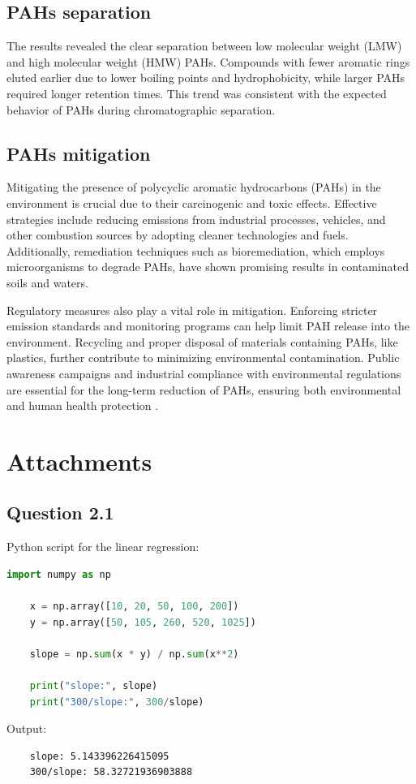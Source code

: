 \documentclass{article}
\newcounter{myequation}
\newcommand{\ccit}[1]{\citeauthor{#1} \cite{#1}}
\begin{document}
\subsection{PAHs separation}
The results revealed the clear separation between low molecular weight (LMW) and high
molecular weight (HMW) PAHs. Compounds with fewer aromatic rings eluted earlier due to
lower boiling points and hydrophobicity, while larger PAHs required longer retention times.
This trend was consistent with the expected behavior of PAHs during chromatographic
separation.

\subsection{PAHs mitigation}
Mitigating the presence of polycyclic aromatic hydrocarbons (PAHs) in the environment is
crucial due to their carcinogenic and toxic effects. Effective strategies include reducing
emissions from industrial processes, vehicles, and other combustion sources by adopting
cleaner technologies and fuels. Additionally, remediation techniques such as
bioremediation, which employs microorganisms to degrade PAHs, have shown promising results
in contaminated soils and waters.

Regulatory measures also play a vital role in mitigation. Enforcing stricter emission
standards and monitoring programs can help limit PAH release into the environment.
Recycling and proper disposal of materials containing PAHs, like plastics, further
contribute to minimizing environmental contamination. Public awareness campaigns and
industrial compliance with environmental regulations are essential for the long-term
reduction of PAHs, ensuring both environmental and human health protection \ccit{HARITASH20091}.

\newpage
\listoffigures

\listoftables

\listofmyequations

\setlength{\bibitemsep}{1.2\baselineskip}
\printbibliography

\newpage
\section{Attachments}
\subsection{Question 2.1}
\label{sec:linear_python}
Python script for the linear regression:

\begin{lstlisting}[language=Python, caption=Calibration curve]
    import numpy as np

    x = np.array([10, 20, 50, 100, 200])
    y = np.array([50, 105, 260, 520, 1025])
    
    slope = np.sum(x * y) / np.sum(x**2)
    
    print("slope:", slope)
    print("300/slope:", 300/slope)
\end{lstlisting}

Output:
\begin{lstlisting}
    slope: 5.143396226415095
    300/slope: 58.32721936903888
\end{lstlisting}
\end{document}

